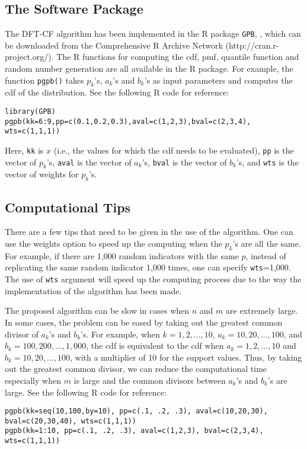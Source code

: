 \documentclass[12pt]{article}
\begin{document}
\subsection{The Software Package}
The DFT-CF algorithm has been implemented in the R package \texttt{GPB}, , which can be downloaded from the Comprehensive R Archive Network (http://cran.r-project.org/). The R functions for computing the cdf, pmf, quantile function and random number generation are all available in the R package. For example, the function \texttt{pgpb()} takes $p_k$'s, $a_k$'s and $b_k$'s as input parameters and computes the cdf of the distribution. See the following R code for reference:
\begin{verbatim}
library(GPB)
pgpb(kk=6:9,pp=c(0.1,0.2,0.3),aval=c(1,2,3),bval=c(2,3,4),
wts=c(1,1,1))
\end{verbatim}
Here, \texttt{kk} is $x$ (i.e., the values for which the cdf needs to be evaluated), \texttt{pp} is the vector of $p_k$'s, \texttt{aval} is the vector of $a_k$'s, \texttt{bval} is the vector of $b_k$'s, and \texttt{wts} is the vector of weights for $p_k$'s.


\subsection{Computational Tips}
There are a few tips that need to be given in the use of the algorithm.  One can use the weights option to speed up the computing when the $p_k$'s are all the same. For example, if there are 1{,}000 random indicators with the same $p$, instead of replicating the same random indicator 1{,}000 times, one can specify \texttt{wts}=1{,}000. The use of \texttt{wts} argument will speed up the computing process due to the way the implementation of the algorithm has been made.

The proposed algorithm can be slow in cases when $n$ and $m$ are extremely large. In some cases, the problem can be eased by taking out the greatest common divisor of $a_k$'s and $b_k$'s. For example, when $k=1, 2, \dots, 10$, $a_k = {10, 20, \dots, 100}$, and $b_k = {100, 200, \dots, 1{,}000}$, the cdf is equivalent to the cdf when $a_k = {1, 2, \dots, 10}$ and $b_k = {10, 20, \dots, 100}$, with a multiplier of 10 for the support values. Thus, by taking out the greatest common divisor, we can reduce the computational time especially when $m$ is large and the common divisors between $a_k$'s and $b_k$'s are large. See the following R code for reference:
\begin{verbatim}
pgpb(kk=seq(10,100,by=10), pp=c(.1, .2, .3), aval=c(10,20,30),
bval=c(20,30,40), wts=c(1,1,1))
pgpb(kk=1:10, pp=c(.1, .2, .3), aval=c(1,2,3), bval=c(2,3,4),
wts=c(1,1,1))
\end{verbatim}
\end{document}
